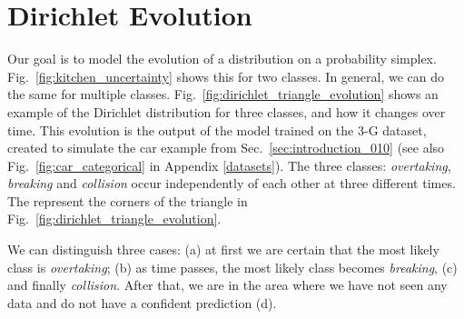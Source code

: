 \section{Dirichlet Evolution}
\label{dirichlet_triangle_evolution}

Our goal is to model the evolution of a distribution on a probability simplex. Fig.\ \ref{fig:kitchen_uncertainty} shows this for two classes. In general, we can do the same for multiple classes. Fig.\ \ref{fig:dirichlet_triangle_evolution} shows an example of the  Dirichlet distribution for three classes, and how it changes over time. This evolution is the output of the \DirModel model trained on the 3-G dataset, created to simulate the car example from Sec.\ \ref{sec:introduction_010} (see also Fig.\ \ref{fig:car_categorical} in Appendix \ref{datasets}). The three classes: \textit{overtaking}, \textit{breaking} and \textit{collision} occur independently of each other at three different times. The represent the corners of the triangle in Fig.~\ref{fig:dirichlet_triangle_evolution}.

We can distinguish three cases: (a) at first we are certain that the most likely class is \textit{overtaking}; (b) as time passes, the most likely class becomes \textit{breaking}, (c) and finally \textit{collision}. After that, we are in the area where we have not seen any data and do not have a confident prediction (d).

